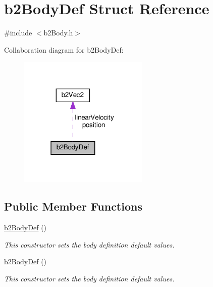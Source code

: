 \hypertarget{structb2BodyDef}{}\section{b2\+Body\+Def Struct Reference}
\label{structb2BodyDef}


{\ttfamily \#include $<$b2\+Body.\+h$>$}



Collaboration diagram for b2\+Body\+Def\+:
\nopagebreak
\begin{figure}[H]
\begin{center}
\leavevmode
\includegraphics[width=175pt]{structb2BodyDef__coll__graph}
\end{center}
\end{figure}
\subsection*{Public Member Functions}
\begin{DoxyCompactItemize}
\item 
\mbox{\label{structb2BodyDef_a87bee47596b3b3eced0d9dd1f4c18fee}} 
\hyperlink{structb2BodyDef_a87bee47596b3b3eced0d9dd1f4c18fee}{b2\+Body\+Def} ()
\begin{DoxyCompactList}\small\item\em This constructor sets the body definition default values. \end{DoxyCompactList}\item 
\mbox{\label{structb2BodyDef_a87bee47596b3b3eced0d9dd1f4c18fee}} 
\hyperlink{structb2BodyDef_a87bee47596b3b3eced0d9dd1f4c18fee}{b2\+Body\+Def} ()
\begin{DoxyCompactList}\small\item\em This constructor sets the body definition default values. \end{DoxyCompactList}\end{DoxyCompactItemize}
